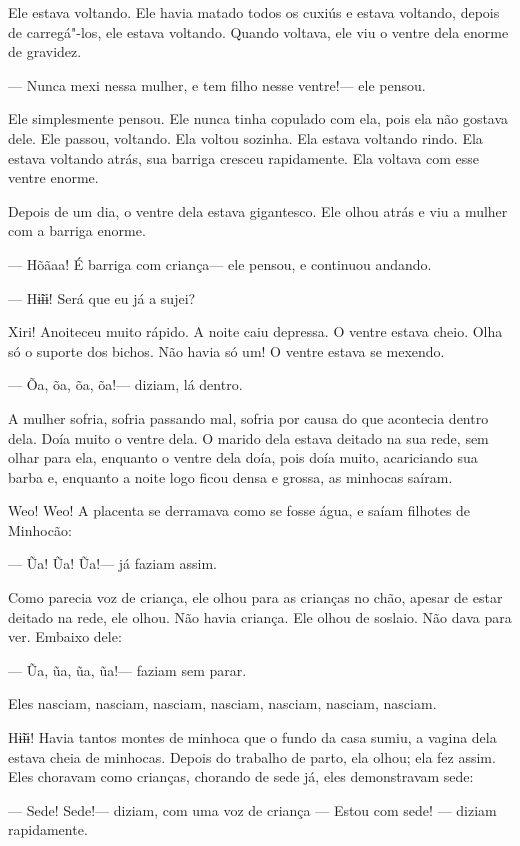 Ele estava voltando. Ele havia matado todos os cuxiús e estava voltando,
depois de carregá"-los, ele estava voltando. Quando voltava, ele viu o
ventre dela enorme de gravidez. 

--- Nunca mexi nessa mulher, e tem filho nesse ventre!--- ele pensou. 

Ele simplesmente pensou. Ele nunca tinha copulado com ela, pois ela não
gostava dele. Ele passou, voltando. Ela voltou sozinha. Ela estava
voltando rindo. Ela estava voltando atrás, sua barriga cresceu
rapidamente. Ela voltava com esse ventre enorme. 

Depois de um dia, o ventre dela estava gigantesco. Ele olhou atrás e viu
a mulher com a barriga enorme. 

--- Hõãaa! É barriga com criança--- ele pensou, e continuou andando. 

--- Hɨ̃ɨɨ! Será que eu já a sujei?

Xiri! Anoiteceu muito rápido. A noite caiu depressa. O ventre estava
cheio. Olha só o suporte dos bichos. Não havia só um! O ventre estava se
mexendo. 

--- Õa, õa, õa, õa!--- diziam, lá dentro. 

A mulher sofria, sofria passando mal, sofria por causa do que acontecia
dentro dela. Doía muito o ventre dela. O marido dela estava deitado na
sua rede, sem olhar para ela, enquanto o ventre dela doía, pois doía
muito, acariciando sua barba e, enquanto a noite logo ficou densa e
grossa, as minhocas saíram.

Weo! Weo! A placenta se derramava como se fosse água, e saíam filhotes de
Minhocão:

--- Ũa! Ũa! Ũa!--- já faziam assim. 

Como parecia voz de criança, ele olhou para as crianças no chão, apesar
de estar deitado na rede, ele olhou. Não havia criança. Ele olhou de
soslaio. Não dava para ver. Embaixo dele:

--- Ũa, ũa, ũa, ũa!--- faziam sem parar. 

Eles nasciam, nasciam, nasciam, nasciam, nasciam, nasciam, nasciam. 

Hɨ̃ɨɨ! Havia tantos montes de minhoca que o fundo da casa sumiu, a vagina
dela estava cheia de minhocas. Depois do trabalho de parto, ela
olhou; ela fez assim. Eles choravam como crianças, chorando de sede
já, eles demonstravam sede: 

--- Sede! Sede!--- diziam, com uma voz de criança --- Estou com sede! ---
diziam rapidamente. 

